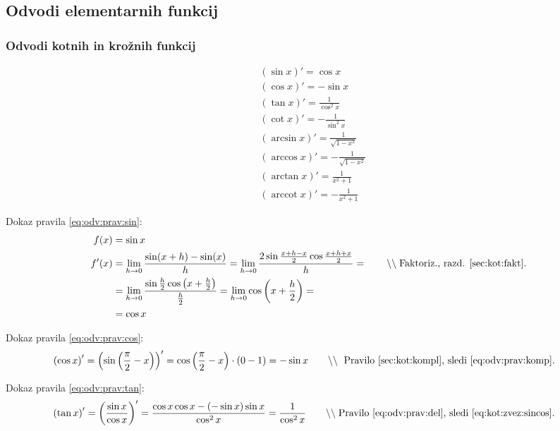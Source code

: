 \documentclass[a4paper,oneside,12pt,fleqn]{article}
\newcommand\krat\cdot
\newcommand{\comment}[1]{\ensuremath{\qquad\backslash\backslash\;}\textnormal{#1}}
\newcommand{\arccot}{\ensuremath{\operatorname{arccot}}} %
\def\kos{\cos}
\def\limh{\lim_{h\rightarrow0}} %
\numberwithin{equation}{section}
\begin{document}
\subsection{Odvodi elementarnih funkcij}
\label{sec:odv:elem}
\subsubsection{Odvodi kotnih in krožnih funkcij}
\label{sec:odv:elem:kot}

\begin{align}
  & \left( \sin x \right)' = \kos x \label{eq:odv:prav:sin} \\
  & \left( \kos x \right)' = -\sin x \label{eq:odv:prav:cos} \\
  & \left( \tan x \right)' = \frac{1}{\kos^2x} \label{eq:odv:prav:tan} \\
  & \left( \cot x \right)' = -\frac{1}{\sin^2x} \label{eq:odv:prav:cot} \\
  & \left( \arcsin x \right)' = \frac{1}{\sqrt{1-x^2}} \label{eq:odv:prav:asin} \\
  & \left( \arccos x \right)' = -\frac{1}{\sqrt{1-x^2}} \label{eq:odv:prav:acos} \\
  & \left( \arctan x \right)' = \frac{1}{x^2+1} \label{eq:odv:prav:atan} \\
  & \left( \arccot x \right)' = -\frac{1}{x^2+1} \label{eq:odv:prav:acot}
\end{align}

Dokaz pravila \eqref{eq:odv:prav:sin}:
\begin{align*}
  f(x) &= \sin x \\
  f'(x) &= \limh\frac{\sin(x+h)-\sin(x)}{h} =
  \limh\frac{2\sin\frac{x+h-x}{2}\cos\frac{x+h+x}{2}}{h} = \comment{Faktoriz., razd. \ref{sec:kot:fakt}.} \\
  &= \limh\frac{\sin\frac{h}{2}\kos\left( x+\frac{h}{2} \right)}{\frac{h}{2}} =
  \limh\kos\left( x+\frac{h}{2} \right) = \\ &= \kos x
\end{align*}

Dokaz pravila \eqref{eq:odv:prav:cos}:
\begin{align*}
  \left( \kos x \right)' &= \left( \sin\left( \frac{\pi}{2} - x \right) \right)' =
  \kos\left( \frac{\pi}{2} - x \right) \krat \left( 0 - 1 \right) = -\sin x
  \comment{ Pravilo \ref{sec:kot:kompl}, sledi \eqref{eq:odv:prav:komp}.}
\end{align*}

Dokaz pravila \eqref{eq:odv:prav:tan}:
\begin{align*}
  \left( \tan x \right)' &= \left( \frac{\sin x}{\kos x} \right)' = \frac{\kos x\kos x -
  \left( -\sin x \right)\sin x}{\kos^2x} = \frac{1}{\kos^2x} \comment{Pravilo
  \ref{eq:odv:prav:del}, sledi \eqref{eq:kot:zvez:sincos}.}
\end{align*}
\end{document}
